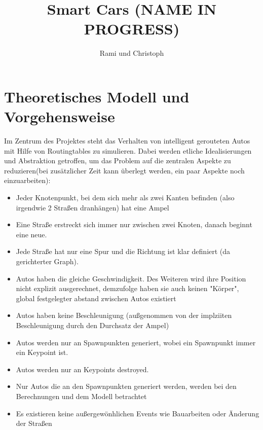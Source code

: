 \documentclass[article, paper=A4,pagesize=auto,11pt,headinclude=true,footinclude=true,BCOR=0mm,DIV=calc]{scrartcl}
\title{Smart Cars (NAME IN PROGRESS)}
\author{Rami und Christoph}
\begin{document}
\maketitle


\section{Theoretisches Modell und Vorgehensweise} 

Im Zentrum des Projektes steht das Verhalten von intelligent gerouteten Autos mit Hilfe von Routingtables zu simulieren. Dabei werden etliche Idealisierungen und Abstraktion getroffen, um das Problem auf die zentralen Aspekte zu reduzieren(bei zusätzlicher Zeit kann überlegt werden, ein paar Aspekte noch einzuarbeiten):
\begin{itemize}
\item Jeder Knotenpunkt, bei dem sich mehr als zwei Kanten befinden (also irgendwie 2 Straßen dranhängen) hat eine Ampel
\item Eine Straße erstreckt sich immer nur zwischen zwei Knoten, danach beginnt eine neue.
\item Jede Straße hat nur eine Spur und die Richtung ist klar definiert  (da gerichterter Graph).
\item Autos haben die gleiche Geschwindigkeit. Des Weiteren wird ihre Position nicht explizit ausgerechnet, demzufolge haben sie auch keinen "Körper", global festgelegter abstand zwischen Autos existiert
\item Autos haben keine Beschleunigung (außgenommen von der implziiten Beschleunigung durch den Durchsatz der Ampel)
\item Autos werden nur an Spawnpunkten generiert, wobei ein Spawnpunkt immer ein Keypoint ist.
\item Autos werden nur an Keypoints destroyed.
\item Nur Autos die an den Spawnpunkten generiert werden, werden bei den Berechnungen und dem Modell betrachtet
\item Es existieren keine außergewönhlichen Events wie Bauarbeiten oder Änderung der Straßen

\end{itemize}
\end{document}
